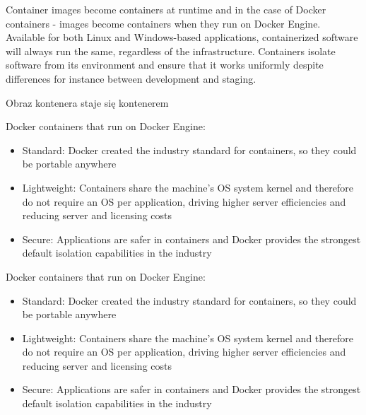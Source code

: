 \documentclass[aspectratio=169]{beamer}
\begin{document}
\begin{frame}
    \begin{card}
        Container images become containers at runtime and in the case of Docker containers - images become containers when they run on Docker Engine. Available for both Linux and Windows-based applications, containerized software will always run the same, regardless of the infrastructure. Containers isolate software from its environment and ensure that it works uniformly despite differences for instance between development and staging.
    \end{card}
    \begin{card}
        Obraz kontenera staje się kontenerem 
    \end{card}
\end{frame}

\begin{frame}
    
    \begin{card}
        Docker containers that run on Docker Engine:
        \begin{itemize}
            \item Standard: Docker created the industry standard for containers, so they could be portable anywhere
            \item Lightweight: Containers share the machine’s OS system kernel and therefore do not require an OS per application, driving higher server efficiencies and reducing server and licensing costs
            \item Secure: Applications are safer in containers and Docker provides the strongest default isolation capabilities in the industry
        \end{itemize}
    \end{card}
\end{frame}

    \begin{card}
        Docker containers that run on Docker Engine:
        \begin{itemize}
            \item Standard: Docker created the industry standard for containers, so they could be portable anywhere
            \item Lightweight: Containers share the machine’s OS system kernel and therefore do not require an OS per application, driving higher server efficiencies and reducing server and licensing costs
            \item Secure: Applications are safer in containers and Docker provides the strongest default isolation capabilities in the industry
        \end{itemize}
    \end{card}
\end{document}
